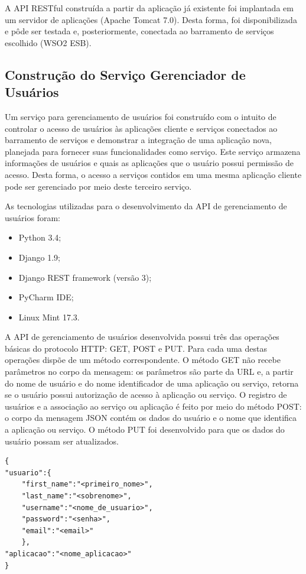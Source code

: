 A API RESTful construída a partir da aplicação já existente foi implantada em um servidor de aplicações (Apache Tomcat 7.0). Desta forma, foi disponibilizada e pôde ser testada e, posteriormente, conectada ao barramento de serviços escolhido (WSO2 ESB).

\subsection{Construção do Serviço Gerenciador de Usuários}
Um serviço para gerenciamento de usuários foi construído com o intuito de controlar o acesso de usuários às aplicações cliente e serviços conectados ao barramento de serviços e demonstrar a integração de uma aplicação nova, planejada para fornecer suas funcionalidades como serviço. Este serviço armazena informações de usuários e quais as aplicações que o usuário possui permissão de acesso. Desta forma, o acesso a serviços contidos em uma mesma aplicação cliente pode ser gerenciado por meio deste terceiro serviço.

As tecnologias utilizadas para o desenvolvimento da API de gerenciamento de usuários foram:
\begin{itemize}
\item Python 3.4;
\item Django 1.9;
\item Django REST framework (versão 3);
\item PyCharm IDE;
\item Linux Mint 17.3.
\end{itemize}

A API de gerenciamento de usuários desenvolvida possui três das operações básicas do protocolo HTTP: GET, POST e PUT. Para cada uma destas operações dispõe de um método correspondente. O método GET não recebe parâmetros no corpo da mensagem: os parâmetros são parte da URL e, a partir do nome de usuário e do nome identificador de uma aplicação ou serviço, retorna se o usuário possui autorização de acesso à aplicação ou serviço. O registro de usuários e a associação ao serviço ou aplicação é feito por meio do método POST: o corpo da mensagem JSON contém os dados do usuário e o nome que identifica a aplicação ou serviço. O método PUT foi desenvolvido para que os dados do usuário possam ser atualizados.


\begin{lstlisting}[caption={Formato de mensagem recebido pelo serviço de gerenciamento de usuários (método POST).},label={lst:msgloginpost}]
{
"usuario":{
	"first_name":"<primeiro_nome>",
	"last_name":"<sobrenome>",
	"username":"<nome_de_usuario>",
	"password":"<senha>",
	"email":"<email>"
	},
"aplicacao":"<nome_aplicacao>"
}
\end{lstlisting}

